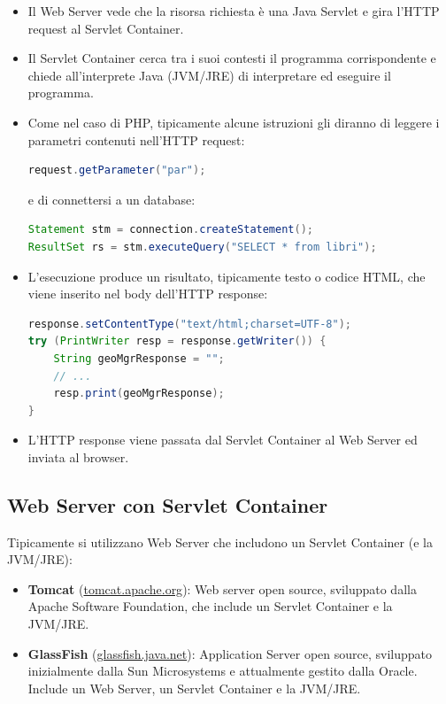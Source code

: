 \begin{itemize}
    \item Il Web Server vede che la risorsa richiesta è una Java Servlet e gira l'HTTP request al Servlet Container.
    \item Il Servlet Container cerca tra i suoi contesti il programma corrispondente e chiede all'interprete Java (JVM/JRE) di interpretare ed eseguire il programma.
    \item Come nel caso di PHP, tipicamente alcune istruzioni gli diranno di leggere i parametri contenuti nell'HTTP request:
    \begin{lstlisting}[language=Java]
request.getParameter("par");
    \end{lstlisting}
    e di connettersi a un database:
    \begin{lstlisting}[language=Java]
Statement stm = connection.createStatement();
ResultSet rs = stm.executeQuery("SELECT * from libri");
    \end{lstlisting}
    \item L'esecuzione produce un risultato, tipicamente testo o codice HTML, che viene inserito nel body dell'HTTP response:
    \begin{lstlisting}[language=Java]
response.setContentType("text/html;charset=UTF-8");
try (PrintWriter resp = response.getWriter()) {
    String geoMgrResponse = "";
    // ...
    resp.print(geoMgrResponse);
}
    \end{lstlisting}
    \item L'HTTP response viene passata dal Servlet Container al Web Server ed inviata al browser.
\end{itemize}

\subsection{Web Server con Servlet Container}

Tipicamente si utilizzano Web Server che includono un Servlet Container (e la JVM/JRE):

\begin{itemize}
    \item \textbf{Tomcat} (\url{tomcat.apache.org}): Web server open source, sviluppato dalla Apache Software Foundation, che include un Servlet Container e la JVM/JRE.
    \item \textbf{GlassFish} (\url{glassfish.java.net}): Application Server open source, sviluppato inizialmente dalla Sun Microsystems e attualmente gestito dalla Oracle. Include un Web Server, un Servlet Container e la JVM/JRE.
\end{itemize}

